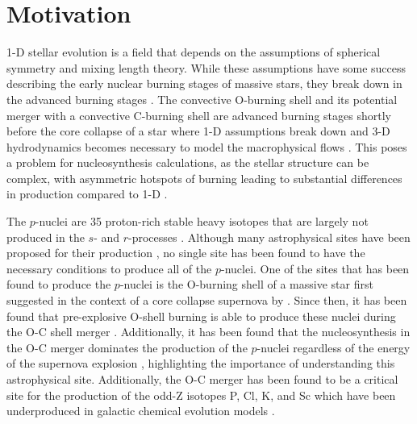 \section{Motivation}

1-D stellar evolution is a field that depends on the assumptions of spherical symmetry and mixing length theory.
While these assumptions have some success describing the early nuclear burning stages of massive stars, they break down in the advanced burning stages \citep{bazanConvectionNucleosynthesisCore1994}.
The convective O-burning shell and its potential merger with a convective C-burning shell are advanced burning stages shortly before the core collapse of a star where 1-D assumptions break down and 3-D hydrodynamics becomes necessary to model the macrophysical flows \citep{meakinTurbulentConvectionStellar2007, jonesIdealizedHydrodynamicSimulations2017, andrassy3DHydrodynamicSimulations2020}.
This poses a problem for nucleosynthesis calculations, as the stellar structure can be complex, with asymmetric hotspots of burning leading to substantial differences in production compared to 1-D \citep{bazanConvectionNucleosynthesisCore1994, rizzutiShellMergersLate2024a}.

The $p$-nuclei are 35 proton-rich stable heavy isotopes that are largely not produced in the $s$- and $r$-processes \citep{burbidgeSynthesisElementsStars1957,woosleyPprocessesSupernovae1978}.
Although many astrophysical sites have been proposed for their production \citep{woosleyAlphaProcessRProcess1992, schatzRpprocessNucleosynthesisExtreme1998, rauscherNucleosynthesisMassiveStars2002, travaglioTestingRoleSNe2015}, no single site has been found to have the necessary conditions to produce all of the $p$-nuclei.
One of the sites that has been found to produce the $p$-nuclei is the O-burning shell of a massive star first suggested in the context of a core collapse supernova by \citep{woosleyPprocessesSupernovae1978}. 
Since then, it has been found that pre-explosive O-shell burning is able to produce these nuclei during the O-C shell merger \citep{rauscherNucleosynthesisMassiveStars2002,ritterConvectivereactiveNucleosynthesisSc2018,robertiGprocessNucleosynthesisCorecollapse2023}.
Additionally, it has been found that the nucleosynthesis in the O-C merger dominates the production of the $p$-nuclei regardless of the energy of the supernova explosion \citep{robertiGprocessNucleosynthesisCorecollapse2024b}, highlighting the importance of understanding this astrophysical site.
Additionally, the O-C merger has been found to be a critical site for the production of the odd-Z isotopes P, Cl, K, and Sc which have been underproduced in galactic chemical evolution models \citep{ritterConvectivereactiveNucleosynthesisSc2018, robertiOccurrenceImpactCarbonOxygen2025}.

